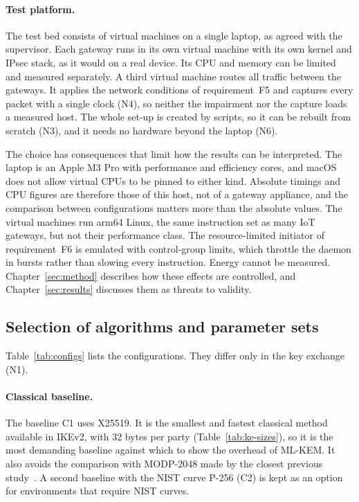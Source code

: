 \paragraph{Test platform.}
The test bed consists of virtual machines on a single laptop, as agreed with
the supervisor. Each gateway runs in its own virtual machine with its own
kernel and IPsec stack, as it would on a real device. Its CPU and memory can be
limited and measured separately. A third virtual machine routes all traffic
between the gateways. It applies the network conditions of requirement~F5 and
captures every packet with a single clock (N4), so neither the impairment nor
the capture loads a measured host. The whole set-up is created by scripts, so
it can be rebuilt from scratch (N3), and it needs no hardware beyond the
laptop (N6).

The choice has consequences that limit how the results can be interpreted.
The laptop is an Apple M3 Pro with performance and efficiency cores, and
macOS does not allow virtual CPUs to be pinned to either kind. Absolute timings
and CPU figures are therefore those of this host, not of a gateway appliance,
and the comparison between configurations matters more than the absolute
values. The virtual machines run arm64 Linux, the same instruction set as
many IoT gateways, but not their performance class. The resource-limited
initiator of requirement~F6 is emulated with control-group limits, which
throttle the daemon in bursts rather than slowing every instruction. Energy
cannot be measured. Chapter~\ref{sec:method} describes how these effects are
controlled, and Chapter~\ref{sec:results} discusses them as threats to
validity.

\subsection{Selection of algorithms and parameter sets}
\label{sec:analysis-algorithms}

Table~\ref{tab:configs} lists the configurations. They differ only in the key
exchange (N1).

\paragraph{Classical baseline.}
The baseline C1 uses X25519. It is the smallest and fastest classical method
available in IKEv2, with 32 bytes per party (Table~\ref{tab:ke-sizes}), so it
is the most demanding baseline against which to show the overhead of ML-KEM.
It also avoids the comparison with MODP-2048 made by the closest previous
study~\cite{twardokus2025}. A second baseline with the NIST curve P-256 (C2)
is kept as an option for environments that require NIST curves.

